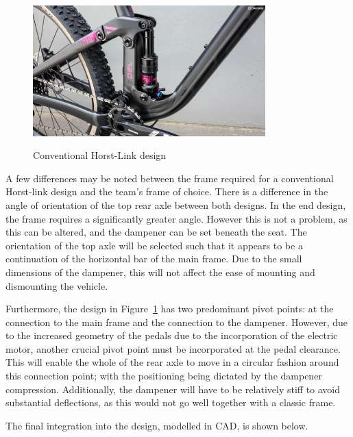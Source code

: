 \documentclass[a4paper,11pt]{article}
\begin{document}
\begin{figure}[!ht]
	\centering
	\includegraphics[width=0.8\textwidth]{horst}
	\caption{Conventional Horst-Link design}
	\cite{stott}
	\label{fig:hor}
\end{figure}

A few differences may be noted between the frame required for a conventional Horst-link design and the team's frame of choice. There is a difference in the angle of orientation of the top rear axle between both designs. In the end design, the frame requires a significantly greater angle. However this is not a problem, as this can be altered, and the dampener can be set beneath the seat. The orientation of the top axle will be selected such that it appears to be a continuation of the horizontal bar of the main frame. Due to the small dimensions of the dampener, this will not affect the ease of mounting and dismounting the vehicle. 

Furthermore, the design in Figure~\ref{fig:hor} has two predominant pivot points: at the connection to the main frame and the connection to the dampener. However, due to the increased geometry of the pedals due to the incorporation of the electric motor, another crucial pivot point must be incorporated at the pedal clearance. This will enable the whole of the rear axle to move in a circular fashion around this connection point; with the positioning being dictated by the dampener compression. Additionally, the dampener will have to be relatively stiff to avoid substantial deflections, as this would not go well together with a classic frame. 

The final integration into the design, modelled in CAD, is shown below.
\end{document}
